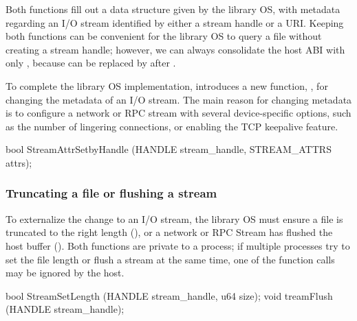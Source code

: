 Both functions fill out a data structure given by the library OS,
with metadata regarding an I/O stream
identified by either a stream handle or a URI.
Keeping both functions can be convenient for the library OS to query a file without creating a stream handle;
however, we can always consolidate the host ABI
with only ,
because  can be replaced by 
after .


To complete the library OS implementation, \graphene{} introduces a new function,
,
for changing the metadata of an I/O stream.
The main reason for changing metadata
is to configure a network or RPC stream with several device-specific options,
such as the number of lingering connections,
or enabling the TCP keepalive feature.









\begin{paldef}
bool StreamAttrSetbyHandle (HANDLE stream_handle,
                            STREAM_ATTRS attrs);
\end{paldef}


\subsubsection*{Truncating a file or flushing a stream}




To externalize the change to an I/O stream, the library OS must ensure a file is truncated to the right length (), or a network or RPC Stream has flushed the host buffer ().
Both functions are private to a process; if multiple processes try
to set the file length or flush a stream at the same time, one of the function calls may be ignored by the host.


\begin{paldef}
bool StreamSetLength (HANDLE stream_handle, u64 size);
void treamFlush (HANDLE stream_handle);
\end{paldef}





